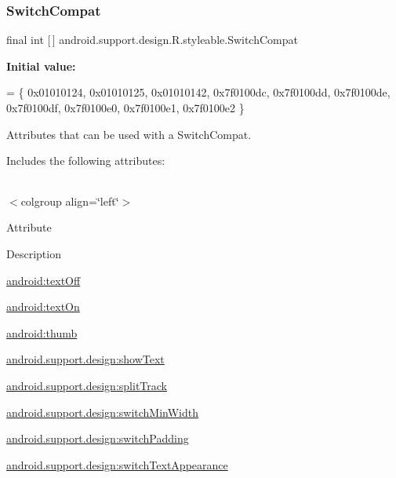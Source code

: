 \subsubsection{\texorpdfstring{Switch\+Compat}{SwitchCompat}}
{\footnotesize\ttfamily final int \mbox{[}$\,$\mbox{]} android.\+support.\+design.\+R.\+styleable.\+Switch\+Compat\hspace{0.3cm}{\ttfamily [static]}}

{\bfseries Initial value\+:}
\begin{DoxyCode}
= \{
            0x01010124, 0x01010125, 0x01010142, 0x7f0100dc,
            0x7f0100dd, 0x7f0100de, 0x7f0100df, 0x7f0100e0,
            0x7f0100e1, 0x7f0100e2
        \}
\end{DoxyCode}
Attributes that can be used with a Switch\+Compat. 

Includes the following attributes\+:

\tabulinesep=1mm
\begin{longtabu} spread 0pt [c]{*{0}{|X[-1]}|}
\hline
\end{longtabu}
$<$colgroup align=\char`\"{}left\char`\"{}$>$ 

Attribute

Description 

{\ttfamily \hyperlink{classandroid_1_1support_1_1design_1_1R_1_1styleable_afc78502d3a5178e334e2aa0dda302911}{android\+:text\+Off}}

{\ttfamily \hyperlink{classandroid_1_1support_1_1design_1_1R_1_1styleable_a0136948ad38febd192da29e124c66592}{android\+:text\+On}}

{\ttfamily \hyperlink{classandroid_1_1support_1_1design_1_1R_1_1styleable_a972b91a83c0a2fdfefe8475614790641}{android\+:thumb}}

{\ttfamily \hyperlink{classandroid_1_1support_1_1design_1_1R_1_1styleable_ace1bee7dddfc32341fc2cd3d3275df8e}{android.\+support.\+design\+:show\+Text}}

{\ttfamily \hyperlink{classandroid_1_1support_1_1design_1_1R_1_1styleable_a68f00076b8d71029b001f03098c38865}{android.\+support.\+design\+:split\+Track}}

{\ttfamily \hyperlink{classandroid_1_1support_1_1design_1_1R_1_1styleable_a585749966845c547e820061f2d0f6148}{android.\+support.\+design\+:switch\+Min\+Width}}

{\ttfamily \hyperlink{classandroid_1_1support_1_1design_1_1R_1_1styleable_aa2d2bf8e29bf1a8f4af8c7cdbd15941c}{android.\+support.\+design\+:switch\+Padding}}

{\ttfamily \hyperlink{classandroid_1_1support_1_1design_1_1R_1_1styleable_ace25056c20b815fd199613151dcea0ec}{android.\+support.\+design\+:switch\+Text\+Appearance}}

